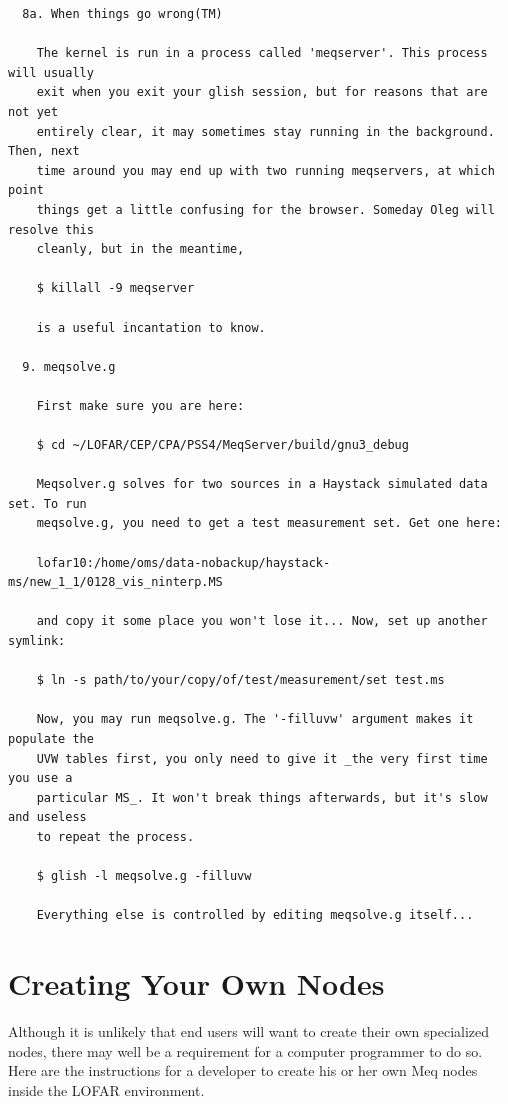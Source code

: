 \documentclass[10pt]{article}
\begin{document}
\begin{verbatim}
  8a. When things go wrong(TM)

    The kernel is run in a process called 'meqserver'. This process will usually
    exit when you exit your glish session, but for reasons that are not yet 
    entirely clear, it may sometimes stay running in the background. Then, next
    time around you may end up with two running meqservers, at which point
    things get a little confusing for the browser. Someday Oleg will resolve this
    cleanly, but in the meantime,

    $ killall -9 meqserver

    is a useful incantation to know.

  9. meqsolve.g

    First make sure you are here:

    $ cd ~/LOFAR/CEP/CPA/PSS4/MeqServer/build/gnu3_debug

    Meqsolver.g solves for two sources in a Haystack simulated data set. To run
    meqsolve.g, you need to get a test measurement set. Get one here:

    lofar10:/home/oms/data-nobackup/haystack-ms/new_1_1/0128_vis_ninterp.MS

    and copy it some place you won't lose it... Now, set up another symlink:

    $ ln -s path/to/your/copy/of/test/measurement/set test.ms

    Now, you may run meqsolve.g. The '-filluvw' argument makes it populate the
    UVW tables first, you only need to give it _the very first time you use a
    particular MS_. It won't break things afterwards, but it's slow and useless
    to repeat the process.

    $ glish -l meqsolve.g -filluvw

    Everything else is controlled by editing meqsolve.g itself...
\end{verbatim}
     
\section{Creating Your Own Nodes }

Although it is unlikely that end users will want to create their
own specialized nodes, there may well be a requirement for a computer 
programmer to do so. Here are the instructions for a developer
to create his or her own Meq nodes inside the LOFAR environment.
\end{document}
